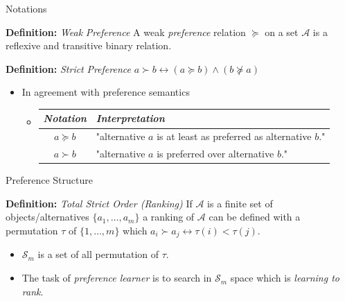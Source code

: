 \documentclass[8pt]{beamer}
\renewcommand{\|}[1][.3em]{\hspace{#1}|\hspace{#1}}
\renewcommand{\,}[1][.3em]{,\hspace{#1}}
\newlength{\wideitemsep}
\let\olditem\item
\renewcommand{\item}{\setlength{\itemsep}{\wideitemsep}\olditem}
\newcommand{\Cp}{\emph{Preference} }
\newcommand{\p}{\emph{preference} }
\renewcommand{\,}{,\hspace{3pt}}
\renewcommand{\|}{\hspace{3pt}|\hspace{3pt}}
\begin{document}
\begin{frame}{Notations}
	\begin{block}{\textbf{Definition:} \textit{Weak} \Cp}
	A weak \p relation  $\succeq$ on a set $\mathcal{A}$ is a reflexive and transitive binary relation.
	\end{block}
	\pause
	\begin{block}{\textbf{Definition:} \textit{Strict} \Cp}\center
	$a \succ b  \longleftrightarrow  (a \succeq b) \wedge (b \nsucceq a)$
	\end{block}
	\pause
    \begin{itemize}
    \item In agreement with preference semantics
        \begin{itemize}
        \item[] \vspace{1em}
            \begin{table}
	            \centering
	            \begin{tabular}{c|l}
	                \textit{Notation} & \textit{Interpretation} \\\hline\rule{0pt}{1.6em}
	                $a \succeq b$ & "alternative $a$ is at least as preferred as alternative $b$." \\\rule{0pt}{1.6em}
	                $a \succ b$ & "alternative $a$ is preferred over alternative $b$."\\
	            \end{tabular}
	        \end{table}
        \end{itemize}
    \end{itemize}
\end{frame}

\begin{frame}{Preference Structure}
	\begin{block}{\textbf{Definition:} \textit{Total Strict Order (Ranking)}}\footnotesize
	If $\mathcal{A}$ is a finite set of objects/alternatives $\{a_1,\ldots,a_m\}$ a ranking of $\mathcal{A}$ can be defined with a permutation $\tau$ of $\{1,\ldots,m\}$ which {\small $a_i \succ a_j \leftrightarrow \tau(i) < \tau(j)$}.
	\end{block}
	\pause
    \begin{itemize}
    \item $\mathcal{S}_m$ is a set of all permutation of $\tau$.
    \item The task of \textit{preference learner} is to search in $\mathcal{S}_m$ space which is \emph{learning to rank}.
    \end{itemize}
\end{frame}
\end{document}
